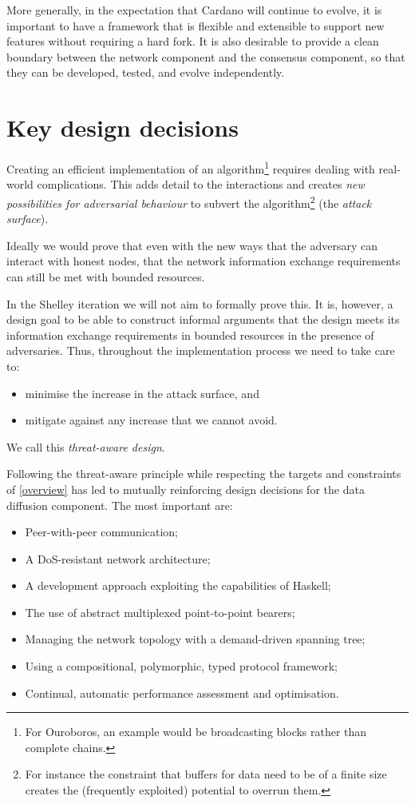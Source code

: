 \documentclass[11pt,a4paper]{article}
\begin{document}
More generally, in the expectation that Cardano will continue to evolve,
it is important to have a framework that is flexible and extensible to
support new features without requiring a hard fork. It is also desirable
to provide a clean boundary between the network component and the
consensus component, so that they can be developed, tested, and evolve
independently.

\section{Key design decisions}
\label{key-design-decisions}

Creating an efficient implementation of an algorithm\footnote{For
  Ouroboros, an example would be broadcasting blocks rather than
  complete chains.} requires dealing with real-world complications. This
adds detail to the interactions and creates \emph{new possibilities for
adversarial behaviour} to subvert the algorithm\footnote{For instance
  the constraint that buffers for data need to be of a finite size
  creates the (frequently exploited) potential to overrun them.} (the
\emph{attack surface}).

Ideally we would prove that even with the new ways that the adversary
can interact with honest nodes, that the network information exchange
requirements can still be met with bounded resources.

In the Shelley iteration we will not aim to formally prove this. It is,
however, a design goal to be able to construct informal arguments that
the design meets its information exchange requirements in bounded
resources in the presence of adversaries. Thus, throughout the
implementation process we need to take care to:

\begin{itemize}
\item
  minimise the increase in the attack surface, and
\item
  mitigate against any increase that we cannot avoid.
\end{itemize}

We call this \emph{threat-aware design}.

Following the threat-aware principle while respecting the targets and
constraints of \cref{overview} has led to
mutually reinforcing design decisions for the data diffusion component.
The most important are:

\begin{itemize}
\item
  Peer-with-peer communication;
\item
  A DoS-resistant network architecture;
\item
  A development approach exploiting the capabilities of Haskell;
\item
  The use of abstract multiplexed point-to-point bearers;
\item
  Managing the network topology with a demand-driven spanning tree;
\item
  Using a compositional, polymorphic, typed protocol framework;
\item
  Continual, automatic performance assessment and optimisation.
\end{itemize}
\end{document}
